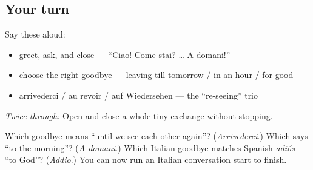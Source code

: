 \subsection*{Your turn}
Say these aloud:

\begin{itemize}
\raggedright
  \item greet, ask, and close — \textquotedblleft{}Ciao! Come stai? … A domani!\textquotedblright{}
  \item choose the right goodbye — leaving till tomorrow / in an hour / for good
  \item arrivederci / au revoir / auf Wiedersehen — the \textquotedblleft{}re-seeing\textquotedblright{} trio
\end{itemize}

\emph{Twice through:} Open and close a whole tiny exchange without stopping.

\begin{tcolorbox}[breakable,colback=teal!4,colframe=teal!35!black,title={Before you move on}]
Which goodbye means \textquotedblleft{}until we see each other again\textquotedblright{}? (\emph{Arrivederci}.) Which says \textquotedblleft{}to the morning\textquotedblright{}? (\emph{A domani}.) Which Italian goodbye matches Spanish \emph{adiós} — \textquotedblleft{}to God\textquotedblright{}? (\emph{Addio}.) You can now run an Italian conversation start to finish.
\end{tcolorbox}
